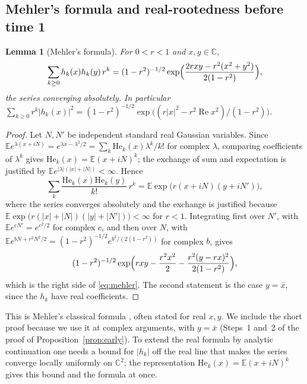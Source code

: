 \documentclass[11pt]{amsart}
\newtheorem{lemma}[theorem]{Lemma}
\theoremstyle{definition}
\theoremstyle{remark}
\numberwithin{equation}{section}
\newcommand{\C}{\mathbb{C}}
\newcommand{\E}{\mathbb{E}}
\newcommand{\He}{\mathrm{He}}
\DeclareMathOperator{\re}{Re}
\begin{document}
\subsection{Mehler's formula and real-rootedness before time 1}

\begin{lemma}[Mehler's formula]\label{lem:mehler}
For $0<r<1$ and $x,y\in\C$,
\begin{equation}\label{eq:mehler}
\sum_{k\ge0}h_k(x)h_k(y)\,r^k=(1-r^2)^{-1/2}\exp\Bigl(\frac{2rxy-r^2(x^2+y^2)}{2(1-r^2)}\Bigr),
\end{equation}
the series converging absolutely. In particular $\sum_{k\ge0}r^k|h_k(x)|^2=(1-r^2)^{-1/2}\exp\bigl((r|x|^2-r^2\re x^2)/(1-r^2)\bigr)$.
\end{lemma}

\begin{proof}
Let $N,N'$ be independent standard real Gaussian variables. Since $\E e^{\lambda(x+iN)}=e^{\lambda x-\lambda^2/2}=\sum_k\He_k(x)\lambda^k/k!$ for complex $\lambda$, comparing coefficients of $\lambda^k$ gives $\He_k(x)=\E(x+iN)^k$; the exchange of sum and expectation is justified by $\E e^{|\lambda|(|x|+|N|)}<\infty$. Hence
\[
\sum_k\frac{\He_k(x)\He_k(y)}{k!}\,r^k=\E\exp\bigl(r(x+iN)(y+iN')\bigr),
\]
where the series converges absolutely and the exchange is justified because $\E\exp\bigl(r(|x|+|N|)(|y|+|N'|)\bigr)<\infty$ for $r<1$. Integrating first over $N'$, with $\E e^{cN'}=e^{c^2/2}$ for complex $c$, and then over $N$, with $\E e^{bN+r^2N^2/2}=(1-r^2)^{-1/2}e^{b^2/(2(1-r^2))}$ for complex $b$, gives
\[
(1-r^2)^{-1/2}\exp\Bigl(rxy-\frac{r^2x^2}2-\frac{r^2(y-rx)^2}{2(1-r^2)}\Bigr),
\]
which is the right side of \eqref{eq:mehler}. The second statement is the case $y=\bar x$, since the $h_k$ have real coefficients.
\end{proof}

This is Mehler's classical formula \cite{Me}, often stated for real $x,y$. We include the short proof because we use it at complex arguments, with $y=\bar x$ (Steps~1 and~2 of the proof of Proposition~\ref{prop:early}). To extend the real formula by analytic continuation one needs a bound for $|h_k|$ off the real line that makes the series converge locally uniformly on $\C^2$; the representation $\He_k(x)=\E(x+iN)^k$ gives this bound and the formula at once.
\end{document}
